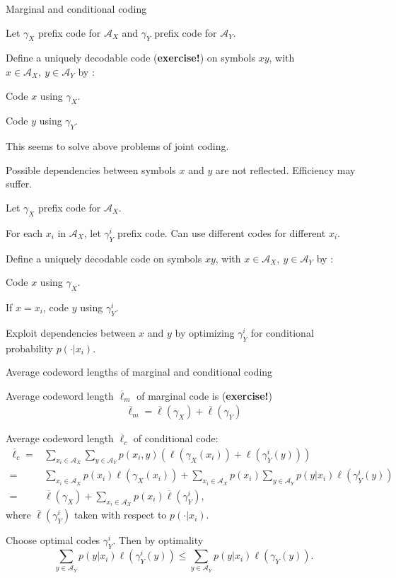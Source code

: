 \begin{frame}{Marginal and conditional coding}
\bit
\item Let $\gamma_X$ prefix code for $\mathcal{A}_X$ and $\gamma_Y$ prefix code for $\mathcal{A}_Y$. 
\item Define a uniquely decodable code (\textbf{exercise!}) on symbols $xy$, with $x\in\mathcal{A}_X, \:y\in\mathcal{A}_Y$ by :
\bit
\item Code $x$ using $\gamma_X$.
\item Code $y$ using $\gamma_Y$. 
\eit
\item This seems to solve above problems of joint coding. 
\item {} Possible dependencies between symbols $x$ and $y$ are not reflected. Efficiency may suffer. 
\eit
{} 
\bit
\item Let $\gamma_X$ prefix code for $\mathcal{A}_X$. 
\item For each $x_i$ in $\mathcal{A}_X$, let $\gamma_Y^{i}$ prefix code. Can use different codes for different $x_i$. 
\item Define a uniquely decodable code on symbols $xy$, with $x\in\mathcal{A}_X, \:y\in\mathcal{A}_Y$ by :
\bit
\item Code $x$ using $\gamma_X$.
\item If $x=x_i$, code $y$ using $\gamma_Y^i$. 
\eit
\item Exploit dependencies between $x$ and $y$ by optimizing $\gamma_Y^i$ for conditional probability $p(\cdot|x_i)$. 
\eit 
\end{frame}


\begin{frame}{Average codeword lengths of marginal and conditional coding}
\bit
\item Average codeword length $\overline{\ell}_m$ of marginal code is (\textbf{exercise!})
\begin{align}\label{CWMarg}
\overline{\ell}_m= \overline{\ell}(\gamma_X)+\overline{\ell}(\gamma_Y) 
\end{align}
\item Average codeword length $\overline{\ell}_c$ of conditional code:
\begin{align}
\overline{\ell}_c=&\sum_{x_i\in\mathcal{A}_X}\sum_{y\in\mathcal{A}_Y}p(x_i,y)(\ell(\gamma_X(x_i))+\ell(\gamma_Y^i(y)))\nonumber\\
=&\sum_{x_i\in\mathcal{A}_X}p(x_i)\ell(\gamma_X(x_i))+\sum_{x_i\in\mathcal{A}_X}p(x_i)\sum_{y\in\mathcal{A}_Y}p(y|x_i)\ell(\gamma_Y^i(y))\label{EqCondL}\\
=&\overline{\ell}(\gamma_X)+\sum_{x_i\in\mathcal{A}_X}p(x_i)\overline\ell(\gamma_Y^i)\nonumber,
\end{align}
where $\overline\ell(\gamma_Y^i)$ taken with respect to $p(\cdot|x_i)$.
\item Choose optimal codes $\gamma_Y^{i}$. Then by optimality
\[
\sum_{y\in\mathcal{A}_Y}p(y|x_i)\ell(\gamma_Y^i(y))\leq \sum_{y\in\mathcal{A}_Y}p(y|x_i)\ell(\gamma_Y(y)).
\] 
\eit
\end{frame}

